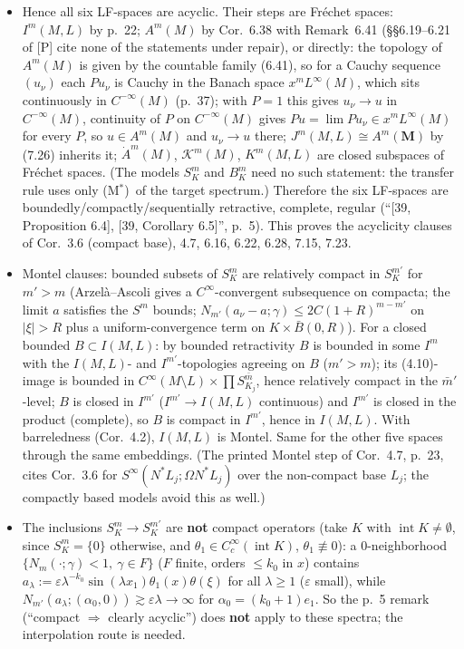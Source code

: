 \documentclass[11pt]{article}
\newcommand{\MB}{\boldsymbol M}
\DeclareMathOperator{\interior}{int}
\newcommand{\Mstar}{(M$^*$)}
\begin{document}
\begin{itemize}
\item Hence all six LF-spaces are acyclic. Their steps are Fr\'echet spaces: $I^m(M,L)$ by p.~22; $A^m(M)$ by Cor.~6.38 with Remark~6.41 (\S\S6.19--6.21 of [P] cite none of the statements under repair), or directly: the topology of $A^m(M)$ is given by the countable family (6.41), so for a Cauchy sequence $(u_\nu)$ each $Pu_\nu$ is Cauchy in the Banach space $x^mL^\infty(M)$, which sits continuously in $C^{-\infty}(M)$ (p.~37); with $P=1$ this gives $u_\nu\to u$ in $C^{-\infty}(M)$, continuity of $P$ on $C^{-\infty}(M)$ gives $Pu=\lim Pu_\nu\in x^mL^\infty(M)$ for every $P$, so $u\in A^m(M)$ and $u_\nu\to u$ there; $J^m(M,L)\cong A^m(\MB)$ by (7.26) inherits it; $\dot A^m(M)$, $\mathcal K^m(M)$, $K^m(M,L)$ are closed subspaces of Fr\'echet spaces. (The models $S^m_K$ and $B^m_K$ need no such statement: the transfer rule uses only \Mstar\ of the target spectrum.) Therefore the six LF-spaces are boundedly/compactly/sequentially retractive, complete, regular (``[39, Proposition 6.4], [39, Corollary 6.5]'', p.~5). This proves the acyclicity clauses of Cor.~3.6 (compact base), 4.7, 6.16, 6.22, 6.28, 7.15, 7.23.
\item Montel clauses: bounded subsets of $S^m_K$ are relatively compact in $S^{m'}_K$ for $m'>m$ (Arzel\`a--Ascoli gives a $C^\infty$-convergent subsequence on compacta; the limit $a$ satisfies the $S^m$ bounds; $N_{m'}(a_\nu-a;\gamma)\le2C(1+R)^{m-m'}$ on $|\xi|>R$ plus a uniform-convergence term on $K\times\bar B(0,R)$). For a closed bounded $B\subset I(M,L)$: by bounded retractivity $B$ is bounded in some $I^m$ with the $I(M,L)$- and $I^{m'}$-topologies agreeing on $B$ ($m'>m$); its (4.10)-image is bounded in $C^\infty(M\setminus L)\times\prod S^{\bar m}_{K_j}$, hence relatively compact in the $\bar m'$-level; $B$ is closed in $I^{m'}$ ($I^{m'}\to I(M,L)$ continuous) and $I^{m'}$ is closed in the product (complete), so $B$ is compact in $I^{m'}$, hence in $I(M,L)$. With barreledness (Cor.~4.2), $I(M,L)$ is Montel. Same for the other five spaces through the same embeddings. (The printed Montel step of Cor.~4.7, p.~23, cites Cor.~3.6 for $S^\infty(N^*L_j;\Omega N^*L_j)$ over the non-compact base $L_j$; the compactly based models avoid this as well.)
\item The inclusions $S^m_K\to S^{m'}_K$ are \textbf{not} compact operators (take $K$ with $\interior K\ne\emptyset$, since $S^m_K=\{0\}$ otherwise, and $\theta_1\in C_c^\infty(\interior K)$, $\theta_1\not\equiv0$): a 0-neighborhood $\{N_m(\cdot;\gamma)<1,\ \gamma\in F\}$ ($F$ finite, orders $\le k_0$ in $x$) contains $a_\lambda:=\varepsilon\lambda^{-k_0}\sin(\lambda x_1)\theta_1(x)\theta(\xi)$ for all $\lambda\ge1$ ($\varepsilon$ small), while $N_{m'}(a_\lambda;(\alpha_0,0))\gtrsim\varepsilon\lambda\to\infty$ for $\alpha_0=(k_0+1)e_1$. So the p.~5 remark (``compact $\Rightarrow$ clearly acyclic'') does \textbf{not} apply to these spectra; the interpolation route is needed.
\end{itemize}
\end{document}

